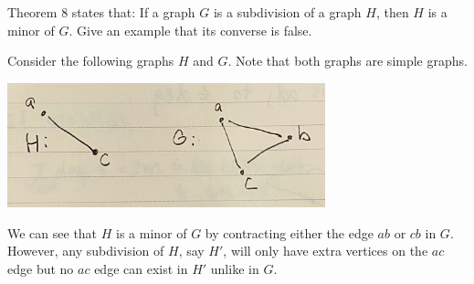 \question Theorem 8 states that: If a graph \(G\) is a subdivision of a graph \(H\), then \(H\) is a minor of \(G\). Give an example that its converse is false.

\begin{solution}
  Consider the following graphs \(H\) and \(G\). Note that both graphs are
  simple graphs.
  
  \begin{center}
    \includegraphics[width=0.69\textwidth]{figures/IMG_7890}
  \end{center}

  We can see that \(H\) is a minor of \(G\) by contracting either the edge
  \(ab\) or \(cb\) in \(G\). However, any subdivision of \(H\), say \(H'\), will
  only have extra vertices on the \(ac\) edge but no \(ac\) edge can exist in
  \(H'\) unlike in \(G\).
\end{solution}
